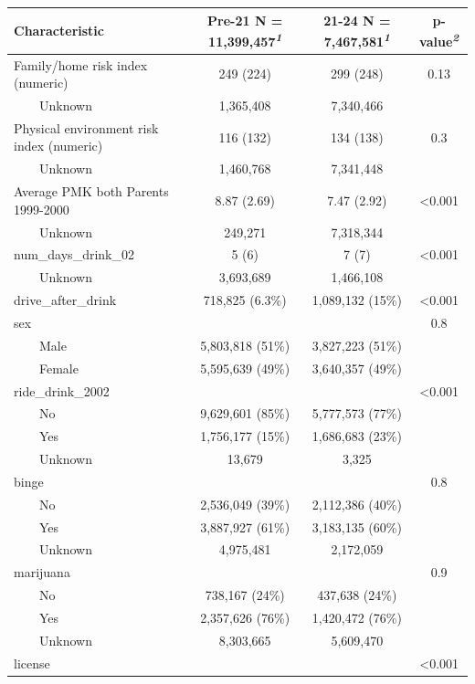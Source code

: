 \documentclass[
]{article}
\begin{document}
\begin{table}[t]
\fontsize{12.0pt}{14.0pt}\selectfont
\begin{tabular*}{\linewidth}{@{\extracolsep{\fill}}lccc}
\toprule
\textbf{Characteristic} & \textbf{Pre-21}  N = 11,399,457\textsuperscript{\textit{1}} & \textbf{21-24}  N = 7,467,581\textsuperscript{\textit{1}} & \textbf{p-value}\textsuperscript{\textit{2}} \\ 
\midrule\addlinespace[2.5pt]
Family/home risk index (numeric) & 249 (224) & 299 (248) & 0.13 \\ 
    Unknown & 1,365,408 & 7,340,466 &  \\ 
Physical environment risk index (numeric) & 116 (132) & 134 (138) & 0.3 \\ 
    Unknown & 1,460,768 & 7,341,448 &  \\ 
Average PMK both Parents 1999-2000 & 8.87 (2.69) & 7.47 (2.92) & <0.001 \\ 
    Unknown & 249,271 & 7,318,344 &  \\ 
num\_days\_drink\_02 & 5 (6) & 7 (7) & <0.001 \\ 
    Unknown & 3,693,689 & 1,466,108 &  \\ 
drive\_after\_drink & 718,825 (6.3\%) & 1,089,132 (15\%) & <0.001 \\ 
sex &  &  & 0.8 \\ 
    Male & 5,803,818 (51\%) & 3,827,223 (51\%) &  \\ 
    Female & 5,595,639 (49\%) & 3,640,357 (49\%) &  \\ 
ride\_drink\_2002 &  &  & <0.001 \\ 
    No & 9,629,601 (85\%) & 5,777,573 (77\%) &  \\ 
    Yes & 1,756,177 (15\%) & 1,686,683 (23\%) &  \\ 
    Unknown & 13,679 & 3,325 &  \\ 
binge &  &  & 0.8 \\ 
    No & 2,536,049 (39\%) & 2,112,386 (40\%) &  \\ 
    Yes & 3,887,927 (61\%) & 3,183,135 (60\%) &  \\ 
    Unknown & 4,975,481 & 2,172,059 &  \\ 
marijuana &  &  & 0.9 \\ 
    No & 738,167 (24\%) & 437,638 (24\%) &  \\ 
    Yes & 2,357,626 (76\%) & 1,420,472 (76\%) &  \\ 
    Unknown & 8,303,665 & 5,609,470 &  \\ 
license &  &  & <0.001 \\ 

\end{tabular*}
\end{table}
\end{document}
